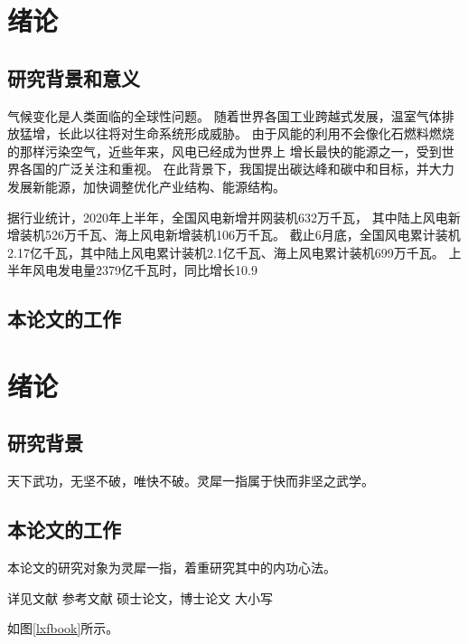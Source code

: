 \chapter{绪论}
\section{研究背景和意义}

气候变化是人类面临的全球性问题。
随着世界各国工业跨越式发展，温室气体排放猛增，长此以往将对生命系统形成威胁。
由于风能的利用不会像化石燃料燃烧的那样污染空气，近些年来，风电已经成为世界上
增长最快的能源之一，受到世界各国的广泛关注和重视。
在此背景下，我国提出碳达峰和碳中和目标，并大力发展新能源，加快调整优化产业结构、能源结构。


据行业统计，2020年上半年，全国风电新增并网装机632万千瓦，
其中陆上风电新增装机526万千瓦、海上风电新增装机106万千瓦。
截止6月底，全国风电累计装机2.17亿千瓦，其中陆上风电累计装机2.1亿千瓦、海上风电累计装机699万千瓦。
上半年风电发电量2379亿千瓦时，同比增长10.9%



\section{本论文的工作}



\chapter{绪论}
\section{研究背景}
天下武功，无坚不破，唯快不破。灵犀一指属于快而非坚之武学。


\section{本论文的工作}
本论文的研究对象为灵犀一指，着重研究其中的内功心法。

详见文献\cite{Peebles2001-100-100}\parencite{Babu2014--}
参考文献\cite[见][49页]{于潇2012-1518-1523}\parencite[见][49页]{Babu2014--}
硕士论文\cite{zhouGPS2015}，博士论文\cite{余勇1998--}
大小写\cite{liu_statistical_2017}

如图\ref{lxfbook}所示。

\begin{figure}
\end{figure}
